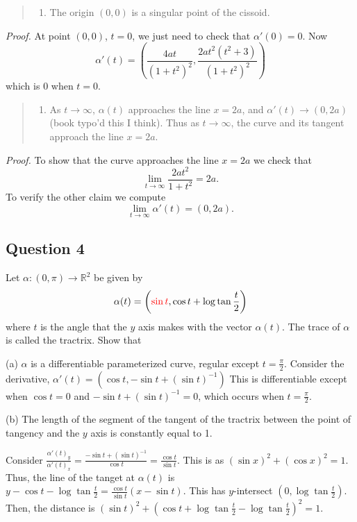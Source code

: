 \documentclass[12pt]{article}
\begin{document}
\begin{quote}
\begin{enumerate}
\def\labelenumi{\alph{enumi}.}
\setcounter{enumi}{1}
\tightlist
\item
  The origin \((0,0)\) is a singular point of the cissoid.
\end{enumerate}
\end{quote}

\emph{Proof.} At point \((0,0)\), \(t = 0\), we just need to check that
\(\alpha'(0) = 0\). Now
\[ \alpha'(t) = \left( \frac{4a t}{(1+t^2)^2}, \frac{2a t^2(t^2 + 3)}{(1+t^2)^2}  \right) \]
which is \(0\) when \(t = 0\).

\begin{quote}
\begin{enumerate}
\def\labelenumi{\alph{enumi}.}
\setcounter{enumi}{2}
\tightlist
\item
  As \(t\to\infty\), \(\alpha(t)\) approaches the line \(x = 2a\), and
  \(\alpha'(t) \to (0, 2a)\) (book typo'd this I think). Thus as
  \(t\to\infty\), the curve and its tangent approach the line
  \(x = 2a\).
\end{enumerate}
\end{quote}

\emph{Proof.} To show that the curve approaches the line \(x=2a\) we
check that \[ \lim_{t\to\infty} \frac{2at^2}{1+t^2} = 2a. \] To verify
the other claim we compute \[ \lim_{t\to\infty} \alpha'(t) = (0, 2a). \]


\subsection*{Question 4}

Let $\alpha : (0, \pi) \to \mathbb R^2$ be given by
$$\alpha(t) = \left ({\color{red}\sin t}, \cos t + \log \tan \frac t2\right )$$
where $t$ is the angle that the $y$ axis makes with the vector $\alpha(t)$. The trace of $\alpha$ is
called the tractrix. 
Show that

(a) $\alpha$ is a differentiable parameterized curve, regular except $t = \frac \pi2$.
Consider the derivative, $\alpha'(t) = \left (\cos t, -\sin t + (\sin t)^{-1}\right )$
This is differentiable except when $\cos t = 0$ and $-\sin t + (\sin t)^{-1} = 0$, 
which occurs when $t = \frac \pi2$.

(b) The length of the segment of the tangent of the tractrix 
between the point of tangency and the $y$ axis is constantly equal to 1.

Consider $\frac {\alpha'(t)_y}{\alpha'(t)_x} = \frac{-\sin t + (\sin t)^{-1}}{\cos t} = \frac {\cos t}{\sin t}.$ This is as $(\sin x)^2 + (\cos x)^2 = 1.$
Thus, the line of the tanget at $\alpha(t)$ is $y - \cos t - \log \tan \frac t2 = \frac{\cos t}{\sin t}(x - \sin t).$
This has $y$-intersect $(0,\log \tan \frac t2).$ Then, the distance is $(\sin t)^2 + (\cos t + \log \tan \frac t2 - \log \tan \frac t2)^2 = 1.$
\end{document}
